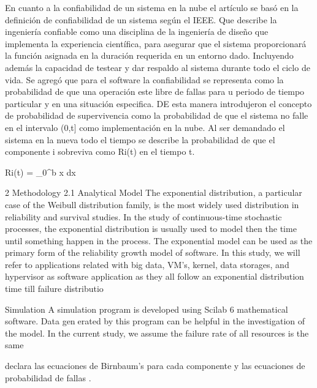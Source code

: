En cuanto a la confiabilidad de un sistema en la nube el artículo se basó en la definición de confiabilidad de un sistema según el IEEE. Que describe la ingeniería confiable como una disciplina de la ingeniería de diseño que implementa la experiencia científica, para asegurar que el sistema proporcionará la función asignada en la duración requerida en un entorno dado. Incluyendo además la capacidad de testear y dar respaldo al sistema durante todo el ciclo de vida. Se agregó que para el software la confiabilidad se representa como la probabilidad de que una operación este libre de fallas para u periodo de tiempo particular y en una situación especifica.
DE esta manera introdujeron el concepto de probabilidad de supervivencia como la probabilidad de que el sistema no falle en el intervalo (0,t]  como implementación en la nube. Al ser demandado el sistema en la nueva todo el tiempo se describe la probabilidad de que el componente i sobreviva como Ri(t) en el tiempo t.

Ri(t) = \int_{0}^{b} x dx


2 Methodology
2.1 Analytical Model
The exponential distribution, a particular case of the Weibull distribution family, is the
most widely used distribution in reliability and survival studies. In the study of
continuous-time stochastic processes, the exponential distribution is usually used to
model then the time until something happen in the process. The exponential model can
be used as the primary form of the reliability growth model of software. In this study,
we will refer to applications related with big data, VM’s, kernel, data storages, and
hypervisor as software application as they all follow an exponential distribution time
till failure distributio



Simulation
A simulation program is developed using Scilab 6 mathematical software. Data generated by this program can be helpful in the investigation of the model. In the current
study, we assume the failure rate of all resources is the same


declara las ecuaciones de Birnbaum’s para cada componente y las ecuaciones de probabilidad de fallas .

